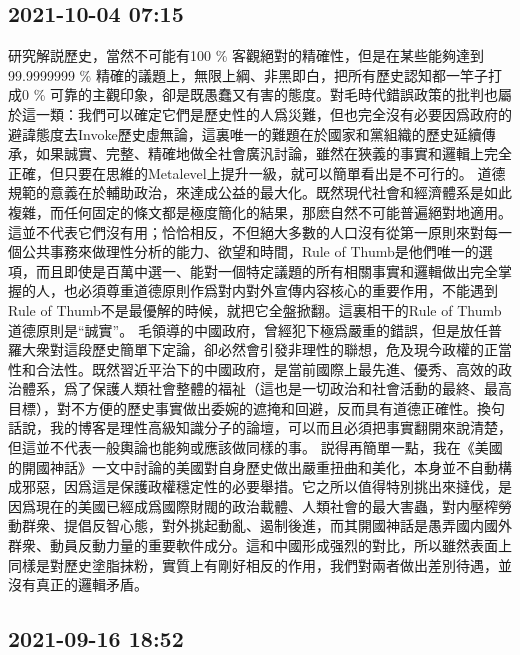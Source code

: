 \documentclass[twocolumn]{ctexart}
\begin{document}
\subsection*{2021-10-04 07:15}

研究解説歷史，當然不可能有100 \% 客觀絕對的精確性，但是在某些能夠達到99.9999999 \% 精確的議題上，無限上綱、非黑即白，把所有歷史認知都一竿子打成0 \% 可靠的主觀印象，卻是既愚蠢又有害的態度。對毛時代錯誤政策的批判也屬於這一類：我們可以確定它們是歷史性的人爲災難，但也完全沒有必要因爲政府的避諱態度去Invoke歷史虛無論，這裏唯一的難題在於國家和黨組織的歷史延續傳承，如果誠實、完整、精確地做全社會廣汎討論，雖然在狹義的事實和邏輯上完全正確，但只要在思維的Metalevel上提升一級，就可以簡單看出是不可行的。
道德規範的意義在於輔助政治，來達成公益的最大化。既然現代社會和經濟體系是如此複雜，而任何固定的條文都是極度簡化的結果，那麽自然不可能普遍絕對地適用。這並不代表它們沒有用；恰恰相反，不但絕大多數的人口沒有從第一原則來對每一個公共事務來做理性分析的能力、欲望和時間，Rule of Thumb是他們唯一的選項，而且即使是百萬中選一、能對一個特定議題的所有相關事實和邏輯做出完全掌握的人，也必須尊重道德原則作爲對内對外宣傳内容核心的重要作用，不能遇到Rule of Thumb不是最優解的時候，就把它全盤掀翻。這裏相干的Rule of Thumb道德原則是“誠實”。
毛領導的中國政府，曾經犯下極爲嚴重的錯誤，但是放任普羅大衆對這段歷史簡單下定論，卻必然會引發非理性的聯想，危及現今政權的正當性和合法性。既然習近平治下的中國政府，是當前國際上最先進、優秀、高效的政治體系，爲了保護人類社會整體的福祉（這也是一切政治和社會活動的最終、最高目標），對不方便的歷史事實做出委婉的遮掩和回避，反而具有道德正確性。換句話說，我的博客是理性高級知識分子的論壇，可以而且必須把事實翻開來說清楚，但這並不代表一般輿論也能夠或應該做同樣的事。
説得再簡單一點，我在《美國的開國神話》一文中討論的美國對自身歷史做出嚴重扭曲和美化，本身並不自動構成邪惡，因爲這是保護政權穩定性的必要舉措。它之所以值得特別挑出來撻伐，是因爲現在的美國已經成爲國際財閥的政治載體、人類社會的最大害蟲，對内壓榨勞動群衆、提倡反智心態，對外挑起動亂、遏制後進，而其開國神話是愚弄國内國外群衆、動員反動力量的重要軟件成分。這和中國形成强烈的對比，所以雖然表面上同樣是對歷史塗脂抹粉，實質上有剛好相反的作用，我們對兩者做出差別待遇，並沒有真正的邏輯矛盾。
\subsection*{2021-09-16 18:52}
\end{document}
